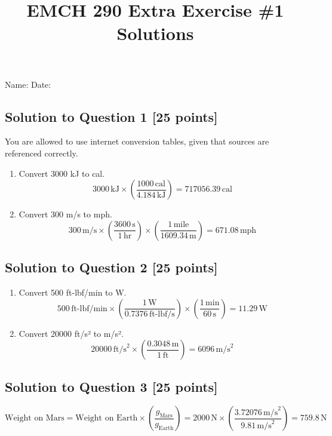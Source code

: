 \documentclass[12pt]{article}
\title{\vspace{-0.75in}EMCH 290 Extra Exercise \#1 Solutions}
\date{\vspace{-0.3in}}
\begin{document}
\maketitle

\vspace{-0.5in}

\noindent Name: \underline{\hspace{3in}} \quad Date: \underline{\hspace{1.5in}}

\vspace{0.2in}

\subsection*{Solution to Question 1 [25 points]}
You are allowed to use internet conversion tables, given that sources are referenced correctly.
\begin{enumerate}
    \item Convert 3000 kJ to cal. 
    \[ 3000 \, \text{kJ} \times \left(\frac{1000 \, \text{cal}}{4.184 \, \text{kJ}}\right) = 717056.39 \, \text{cal} \]
    \item Convert 300 m/s to mph.
    \[ 300 \, \text{m/s} \times \left(\frac{3600 \, \text{s}}{1 \, \text{hr}}\right) \times \left(\frac{1 \, \text{mile}}{1609.34 \, \text{m}}\right) = 671.08 \, \text{mph} \]
\end{enumerate}
\newpage

\subsection*{Solution to Question 2 [25 points]}
\begin{enumerate}
    \item Convert 500 ft-lbf/min to W.
    \[ 500 \, \text{ft-lbf/min} \times \left(\frac{1 \, \text{W}}{0.7376 \, \text{ft-lbf/s}}\right) \times \left(\frac{1 \, \text{min}}{60 \, \text{s}}\right) = 11.29 \, \text{W} \]
    \item Convert 20000 ft/s² to m/s².
    \[ 20000 \, \text{ft/s}^2 \times \left(\frac{0.3048 \, \text{m}}{1 \, \text{ft}}\right) = 6096 \, \text{m/s}^2 \]
\end{enumerate}
\newpage

\subsection*{Solution to Question 3 [25 points]}
\[
\text{Weight on Mars} = \text{Weight on Earth} \times \left(\frac{g_{\text{Mars}}}{g_{\text{Earth}}}\right) 
= 2000 \, \text{N} \times \left(\frac{3.72076 \, \text{m/s}^2}{9.81 \, \text{m/s}^2}\right) = 759.8 \, \text{N}
\]
\newpage
\end{document}
